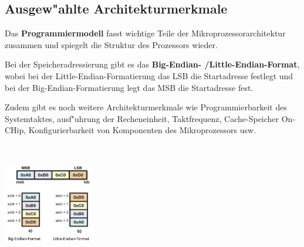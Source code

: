 \subsection{Ausgew"ahlte Architekturmerkmale}
\begin{minipage}{14.5cm}
	Das \textbf{Programmiermodell} fasst wichtige Teile der Mikroprozessorarchitektur zusammen und spiegelt die Struktur des Prozessors wieder.

	Bei der Speicheradressierung gibt es das \textbf{Big-Endian- /Little-Endian-Format}, wobei bei der Little-Endian-Formatierung das LSB die Startadresse festlegt und bei der Big-Endian-Formatierung legt das MSB die Startadresse fest.

	Zudem gibt es noch weitere Architekturmerkmale wie Programmierbarkeit des Systemtaktes, ausf"uhrung der Recheneinheit, Taktfrequenz, Cache-Speicher On-CHip, Konfigurierbarkeit von Komponenten des Mikroprozessors usw.
\end{minipage}
%
\begin{minipage}{0.5cm}
	\ \
\end{minipage}
%
\begin{minipage}{4cm}
	\includegraphics[width=4cm]{pics/Big-Endian_Little-Endian}
\end{minipage}

